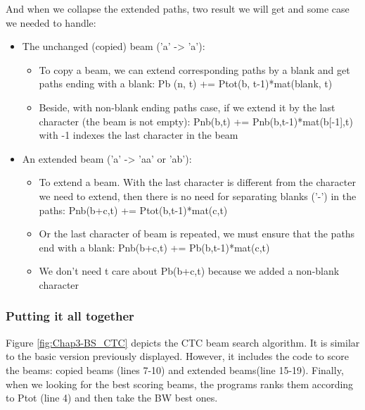       And when we collapse the extended paths, two result we will get and some case we needed to handle:
        \begin{itemize}
          \item The unchanged (copied) beam ('a' -> 'a'):
          \begin{itemize}
            \item To copy a beam, we can extend corresponding paths by a blank and get
            paths ending with a blank: Pb (n, t) += Ptot(b, t-1)*mat(blank, t)
            \item Beside, with non-blank ending paths case, if we extend it by the last
            character (the beam is not empty): Pnb(b,t) += Pnb(b,t-1)*mat(b[-1],t)
            with -1 indexes the last character in the beam
          \end{itemize}
          \item An extended beam ('a' -> 'aa' or 'ab'):
            \begin{itemize}
              \item To extend a beam. With the last character is different from the character we need
              to extend, then there is no need for separating blanks ('-') in the paths:
                Pnb(b+c,t) += Ptot(b,t-1)*mat(c,t)
              \item Or the last character of beam is repeated, we must ensure that the paths
              end with a blank: Pnb(b+c,t) += Pb(b,t-1)*mat(c,t)
              \item We don't need t care about Pb(b+c,t) because we added a non-blank character
            \end{itemize}
        \end{itemize}

      \subsubsection{ Putting it all together }
        Figure \ref{fig:Chap3-BS_CTC} depicts the CTC beam search algorithm. It is similar to the basic version
        previously displayed. However, it includes the code to score the beams: copied beams
        (lines 7-10) and extended beams(line 15-19). Finally, when we looking for the best scoring
        beams, the programs ranks them according to Ptot (line 4) and then take the BW best ones.


